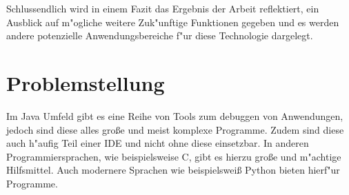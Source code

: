 Schlussendlich wird in einem Fazit das Ergebnis der Arbeit reflektiert, ein Ausblick auf m"ogliche weitere Zuk"unftige Funktionen gegeben und es werden andere potenzielle Anwendungsbereiche f"ur diese Technologie dargelegt.

\section{Problemstellung} 

Im Java Umfeld gibt es eine Reihe von Tools zum debuggen von Anwendungen, jedoch sind diese alles gro\ss{}e und meist komplexe Programme. Zudem sind diese auch h"aufig Teil einer \ac{IDE} und nicht ohne diese einsetzbar.
In anderen Programmiersprachen, wie beispielsweise C, gibt es hierzu gro\ss{}e und m"achtige Hilfsmittel. Auch modernere Sprachen wie beispielswei\ss{} Python bieten hierf"ur Programme. 